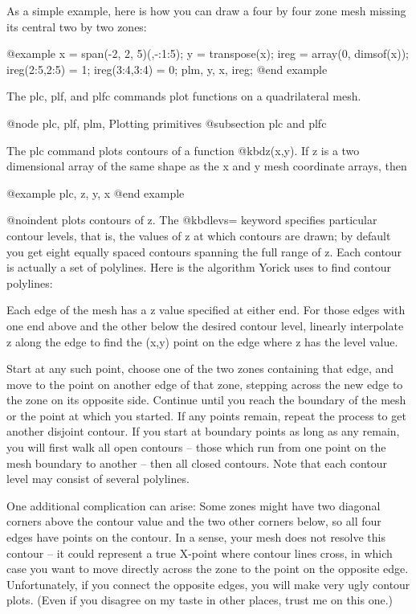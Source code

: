 As a simple example, here is how you can draw a four by four zone
mesh missing its central two by two zones:

@example
x = span(-2, 2, 5)(,-:1:5);
y = transpose(x);
ireg = array(0, dimsof(x));
ireg(2:5,2:5) = 1;
ireg(3:4,3:4) = 0;
plm, y, x, ireg;
@end example

The plc, plf, and plfc commands plot functions on a quadrilateral mesh.

@node plc, plf, plm, Plotting primitives
@subsection plc and plfc

The plc command plots contours of a function @kbd{z(x,y)}.  If z is a two
dimensional array of the same shape as the x and y mesh coordinate
arrays, then

@example
plc, z, y, x
@end example

@noindent
plots contours of z.  The @kbd{levs=} keyword specifies particular contour
levels, that is, the values of z at which contours are drawn; by
default you get eight equally spaced contours spanning the full range
of z.  Each contour is actually a set of polylines.  Here is the
algorithm Yorick uses to find contour polylines:

Each edge of the mesh has a z value specified at either end.  For
those edges with one end above and the other below the desired contour
level, linearly interpolate z along the edge to find the (x,y) point
on the edge where z has the level value.

Start at any such point, choose one of the two zones containing that
edge, and move to the point on another edge of that zone, stepping
across the new edge to the zone on its opposite side.  Continue until
you reach the boundary of the mesh or the point at which you started.
If any points remain, repeat the process to get another disjoint
contour.  If you start at boundary points as long as any remain, you
will first walk all open contours -- those which run from one point on
the mesh boundary to another -- then all closed contours.  Note that
each contour level may consist of several polylines.

One additional complication can arise: Some zones might have two
diagonal corners above the contour value and the two other corners
below, so all four edges have points on the contour.  In a sense, your
mesh does not resolve this contour -- it could represent a true
X-point where contour lines cross, in which case you want to move
directly across the zone to the point on the opposite edge.
Unfortunately, if you connect the opposite edges, you will make very
ugly contour plots.  (Even if you disagree on my taste in other
places, trust me on this one.)


